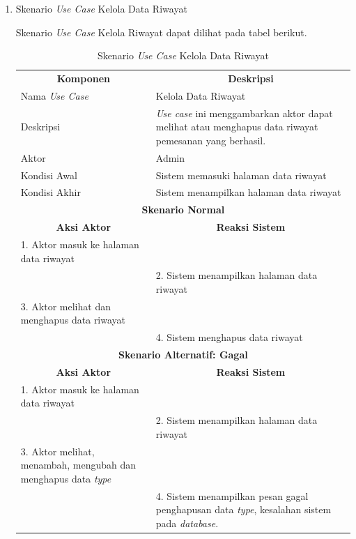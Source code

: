 \begin{enumerate}[label=\alph*.]
        
    \item Skenario \textit{Use Case} Kelola Data Riwayat
	
	\par Skenario \textit{Use Case} Kelola Riwayat dapat dilihat pada tabel berikut.

        \begin{longtable}{|p{5cm}|p{9cm}|}
	    \captionsetup{position=above} %
	    \caption{Skenario \textit{Use Case} Kelola Data Riwayat}
	    \label{tab:my-table} \\ \hline
	    \multicolumn{1}{|c|}{\textbf{Komponen}} & \multicolumn{1}{c|}{\textbf{Deskripsi}} \\ \hline
	    \endfirsthead
	    \endhead
	    Nama \textit{Use Case} & Kelola Data Riwayat \\ \hline
	    Deskripsi & \textit{Use case} ini menggambarkan aktor dapat melihat atau menghapus data riwayat pemesanan yang berhasil. \\ \hline
	    Aktor & Admin \\ \hline
	    Kondisi Awal & Sistem memasuki halaman data riwayat \\ \hline
	    Kondisi Akhir & Sistem menampilkan halaman data riwayat \\ \hline
	    \multicolumn{2}{|c|}{\textbf{Skenario Normal}} \\ \hline
	    \multicolumn{1}{|c|}{\textbf{Aksi Aktor}} & \multicolumn{1}{c|}{\textbf{Reaksi Sistem}} \\ \hline
	    1. Aktor masuk ke halaman data riwayat & \\ \hline
	    & 2. Sistem menampilkan halaman data riwayat \\ \hline
	    3. Aktor melihat dan menghapus data riwayat & \\ \hline
	    & 4. Sistem menghapus data riwayat \\ \hline
	    \multicolumn{2}{|c|}{\textbf{Skenario Alternatif: Gagal}} \\ \hline
	    \multicolumn{1}{|c|}{\textbf{Aksi Aktor}} & \multicolumn{1}{c|}{\textbf{Reaksi Sistem}} \\ \hline
	    1. Aktor masuk ke halaman data riwayat & \\ \hline
	    & 2. Sistem menampilkan halaman data riwayat \\ \hline
	    3. Aktor melihat, menambah, mengubah dan menghapus data \textit{type} & \\ \hline
	    & 4. Sistem menampilkan pesan gagal penghapusan data \textit{type}, kesalahan sistem pada \textit{database}. \\ \hline
	\end{longtable}

    
\end{enumerate}
